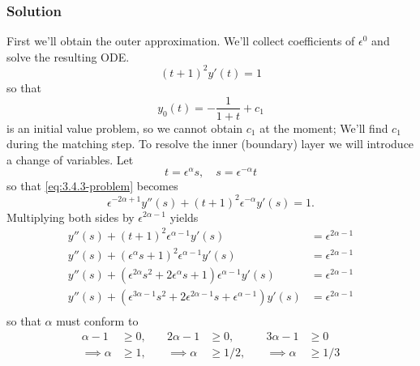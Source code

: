 \documentclass[12pt,twoside]{article}
\begin{document}
\subsubsection*{Solution}
First we'll obtain the outer approximation. We'll collect coefficients of
$\epsilon^0$ and solve the resulting ODE.\@
\begin{equation*}
  {(t+1)}^2y'(t) = 1
\end{equation*}
so that
\begin{equation*}
  \boxed{y_0(t) = -\frac{1}{1+t}+c_1}
\end{equation*}
 is an initial value problem, so we cannot obtain $c_1$
at the moment; We'll find $c_1$ during the matching step. To resolve the inner
(boundary) layer we will introduce a change of variables. Let
\begin{equation*}
  t=\epsilon^{\alpha}s,\quad s=\epsilon^{-\alpha}t
\end{equation*}
so that \cref{eq:3.4.3-problem} becomes
\begin{equation*}
  \epsilon^{-2\alpha+1}y''(s) + {(t+1)}^2\epsilon^{-\alpha}y'(s) = 1.
\end{equation*}
Multiplying both sides by $\epsilon^{2\alpha-1}$ yields
\begin{equation}
  \label{eq:3.4.3-ys-alpha}
  \begin{aligned}
    y''(s) + {(t+1)}^2\epsilon^{\alpha-1}y'(s) &= \epsilon^{2\alpha-1} \\
    y''(s) + {(\epsilon^{\alpha}s+1)}^2\epsilon^{\alpha-1}y'(s) &= \epsilon^{2\alpha-1} \\
    y''(s) + (\epsilon^{2\alpha}s^2 + 2\epsilon^{\alpha}s + 1) \epsilon^{\alpha-1} y'(s) &= \epsilon^{2\alpha-1} \\
    y''(s) + (\epsilon^{3\alpha-1}s^2 + 2\epsilon^{2\alpha-1}s + \epsilon^{\alpha-1}) y'(s) &= \epsilon^{2\alpha-1} \\
  \end{aligned}
\end{equation}
so that $\alpha$ must conform to
\begin{equation}
  \label{eq:3.4.3-alpha-conditions}
  \begin{aligned}
    \alpha-1&\ge0, &\quad 2\alpha-1&\ge0, &\quad 3\alpha-1&\ge0 \\
    \implies \alpha&\ge1, &\quad \implies \alpha&\ge1/2, &\quad \implies \alpha&\ge1/3 \\
  \end{aligned}
\end{equation}
\end{document}
